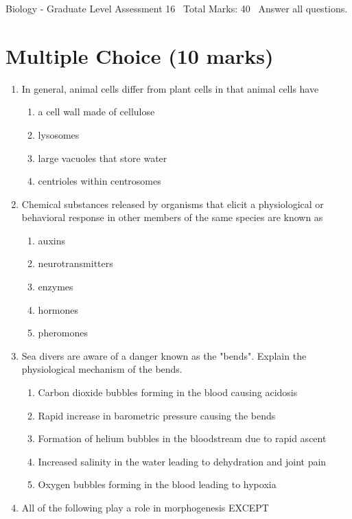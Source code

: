 \documentclass[12pt]{article}
\begin{document}
\begin{center}
Biology - Graduate Level Assessment 16 \
Total Marks: 40 \
Answer all questions.
\end{center}

\section*{Multiple Choice (10 marks)}
\begin{enumerate}[label=\arabic*.]
\item In general, animal cells differ from plant cells in that animal cells have
\begin{enumerate}[label=(\alph*)]
    \item a cell wall made of cellulose
    \item lysosomes
    \item large vacuoles that store water
    \item centrioles within centrosomes
\end{enumerate}
\item Chemical substances released by organisms that elicit a physiological or behavioral response in other members of the same species are known as
\begin{enumerate}[label=(\alph*)]
    \item auxins
    \item neurotransmitters
    \item enzymes
    \item hormones
    \item pheromones
\end{enumerate}
\item Sea divers are aware of a danger known as the "bends". Explain the physiological mechanism of the bends.
\begin{enumerate}[label=(\alph*)]
    \item Carbon dioxide bubbles forming in the blood causing acidosis
    \item Rapid increase in barometric pressure causing the bends
    \item Formation of helium bubbles in the bloodstream due to rapid ascent
    \item Increased salinity in the water leading to dehydration and joint pain
    \item Oxygen bubbles forming in the blood leading to hypoxia
\end{enumerate}
\item All of the following play a role in morphogenesis EXCEPT

\end{enumerate}
\end{document}
